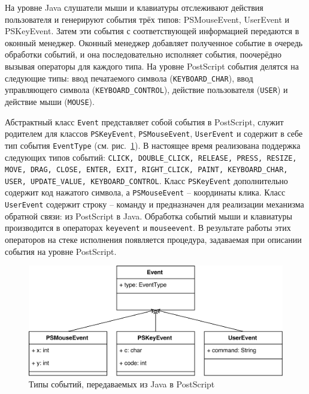 
На уровне Java слушатели мыши и клавиатуры отслеживают действия пользователя и генерируют события трёх типов: PSMouseEvent, UserEvent и PSKeyEvent. Затем эти события с соответствующей информацией передаются в оконный менеджер. Оконный менеджер добавляет полученное событие в очередь обработки событий, и она последовательно исполняет события, поочерёдно вызывая операторы для каждого типа. На уровне PostScript события делятся на следующие типы: ввод печатаемого символа  (\texttt{KEYBOARD\_CHAR}), ввод управляющего символа (\texttt{KEYBOARD\_CONTROL}), действие пользователя (\texttt{USER}) и действие мыши (\texttt{MOUSE}).

Абстрактный класс \texttt{Event} представляет собой события в PostScript, служит родителем для классов \texttt{PSKeyEvent}, \texttt{PSMouseEvent}, \texttt{UserEvent} и содержит в себе тип события \texttt{EventType} (см. рис.~\ref{eventtype}). В настоящее время реализована поддержка следующих типов событий: \texttt{CLICK, DOUBLE\_CLICK, RELEASE, PRESS, RESIZE, MOVE, DRAG, CLOSE, ENTER, EXIT, RIGHT\_CLICK, PAINT, KEYBOARD\_CHAR, USER, UPDATE\_VALUE, KEYBOARD\_CONTROL}. Класс \texttt{PSKeyEvent} дополнительно содержит код нажатого символа, а \texttt{PSMouseEvent} -- координаты клика. Класс \texttt{UserEvent} содержит строку -- команду и предназначен для реализации механизма обратной связи: из PostScript в Java.  Обработка событий мыши и клавиатуры производится в операторах \texttt{keyevent} и \texttt{mouseevent}. В результате работы этих операторов на стеке исполнения появляется процедура, задаваемая при описании события на уровне PostScript.

\begin{figure}[h!]
\centering
\includegraphics[width=\textwidth]{Makulov/Events_from_Java.png}
\caption{Типы событий, передаваемых из Java в PostScript}
\label{eventtype}
\end{figure}


